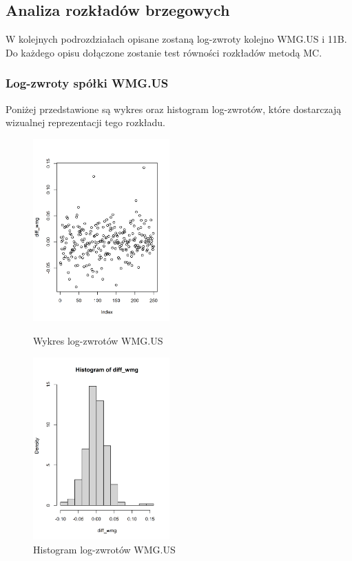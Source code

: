 \documentclass[a4paper,11pt]{article}
\begin{document}
\subsection{Analiza rozkładów brzegowych}
W kolejnych podrozdziałach opisane zostaną log-zwroty kolejno WMG.US i 11B. Do każdego opisu dołączone zostanie test równości rozkładów metodą MC.
\subsubsection{Log-zwroty spółki WMG.US}
Poniżej przedstawione są wykres oraz histogram log-zwrotów, które dostarczają wizualnej reprezentacji tego rozkładu.

\begin{figure}[h]
\centering
\begin{minipage}[b]{0.45\textwidth}
\centering
\includegraphics[width=\textwidth, height=7cm, width = 5.25cm]{img/diff_wmg.png}
\caption{Wykres log-zwrotów WMG.US}
\label{fig:r1}
\end{minipage}
\hfill
\begin{minipage}[b]{0.45\textwidth}
\centering
\includegraphics[width=\textwidth, height=7cm, width = 5.25cm]{img/diff_wmg_histogram.png}
\caption{Histogram log-zwrotów WMG.US}
\label{fig:r2}
\end{minipage}
\end{figure}
\end{document}
